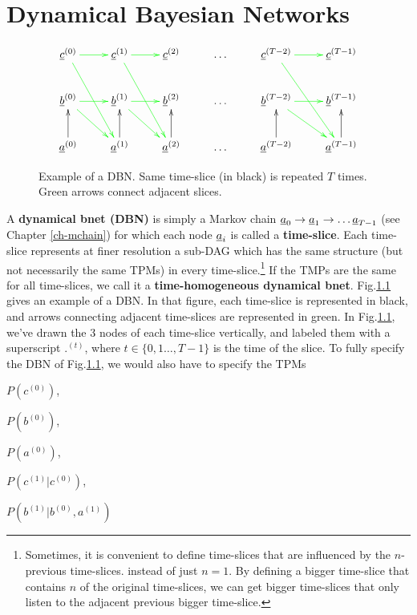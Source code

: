 \chapter{Dynamical Bayesian Networks}
\label{ch-dyn-bnet}

\begin{figure}[h!]
$$
\xymatrix{
\rvc^{(0)}\ar@[green][r]\ar@[green][rdd]
&\rvc^{(1)}\ar@[green][r]\ar@[green][rdd]
&\rvc^{(2)}
&\ldots
&\rvc^{(T-2)}\ar@[green][r]\ar@[green][rdd]
&\rvc^{(T-1)}
\\
\rvb^{(0)}\ar@[green][rd]\ar@[green][r]
&\rvb^{(1)}\ar@[green][rd]\ar@[green][r]
&\rvb^{(2)}
&\ldots
&\rvb^{(T-2)}\ar@[green][rd]\ar@[green][r]
&\rvb^{(T-1)}
\\
\rva^{(0)}\ar[u]
&\rva^{(1)}\ar[u]
&\rva^{(2)}\ar[u]
&\ldots
&\rva^{(T-2)}\ar[u]
&\rva^{(T-1)}\ar[u]
}$$
\caption{
Example of a DBN. Same
time-slice (in black) is repeated $T$ times.
Green arrows connect adjacent slices.
}
\label{fig-dyn-bnet}
\end{figure}



A {\bf dynamical bnet (DBN)} is simply
a Markov chain ${\underline{a}}_0\rightarrow {\underline{a}}_1\rightarrow\ldots {\underline{a}}_{T-1}$ (see Chapter
\ref{ch-mchain})
for which each node ${\underline{a}}_i$ is 
called a {\bf time-slice}.
Each time-slice 
represents
at finer resolution a sub-DAG
which has the same 
structure (but
not necessarily the same TPMs)
in every time-slice.\footnote{Sometimes,
it is convenient to
define time-slices that are influenced by
the $n$-previous time-slices.
instead of just $n=1$.
By defining a bigger time-slice that contains
$n$ of the original time-slices,
we can get bigger time-slices
that only listen to 
the adjacent previous bigger time-slice.}
 If the
TMPs are the same for all time-slices,
we call it a {\bf time-homogeneous dynamical bnet}.
Fig.\ref{fig-dyn-bnet} gives an example
of a DBN.
In that figure, each time-slice
is represented in black, and
arrows connecting adjacent time-slices
are represented in green.
In Fig.\ref{fig-dyn-bnet},
we've drawn the 3 nodes of
each time-slice vertically,
and labeled them
with a superscript ${.}^{(t)}$,
where $t\in \{
0,1 \ldots, T-1\}$ 
is the time
of the slice.
To fully 
specify the
DBN
of Fig.\ref{fig-dyn-bnet},
we would also have to specify
the TPMs 

$P(c^{(0)})$, 

$P(b^{(0)})$,

$P(a^{(0)})$,

$P(c^{(1)}|c^{(0)})$,
 
$P(b^{(1)}|b^{(0)}, a^{(1)})$

